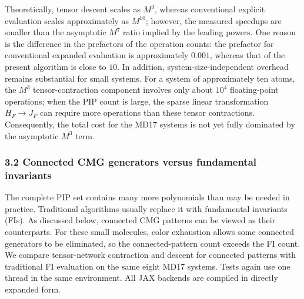 Theoretically, tensor descent scales as \(M^3\), whereas conventional explicit evaluation scales approximately as \(M^{10}\);
however, the measured speedups are smaller than the asymptotic \(M^7\) ratio implied by the leading powers.
One reason is the difference in the prefactors of the operation counts:
the prefactor for conventional expanded evaluation is approximately \(0.001\), whereas that of the present algorithm is close to \(10\).
In addition, system-size-independent overhead remains substantial for small systems.
For a system of approximately ten atoms, the \(M^3\) tensor-contraction component involves only about \(10^4\) floating-point operations;
when the PIP count is large, the sparse linear transformation \(H_F\rightarrow J_F\) can require more operations than these tensor contractions.
Consequently, the total cost for the MD17 systems is not yet fully dominated by the asymptotic \(M^3\) term.

\subsubsection{3.2 Connected CMG generators versus fundamental invariants}\label{md17-connected-fi}

The complete PIP set contains many more polynomials than may be needed in practice. Traditional algorithms usually replace it with fundamental invariants (FIs). As discussed below, connected CMG patterns can be viewed as their counterparts.
For these small molecules, color exhaustion allows some connected generators to be eliminated, so the connected-pattern count exceeds the FI count. We compare tensor-network contraction and descent for connected patterns with traditional FI evaluation on the same eight MD17 systems.
Tests again use one thread in the same environment. All JAX backends are compiled in directly expanded form.


